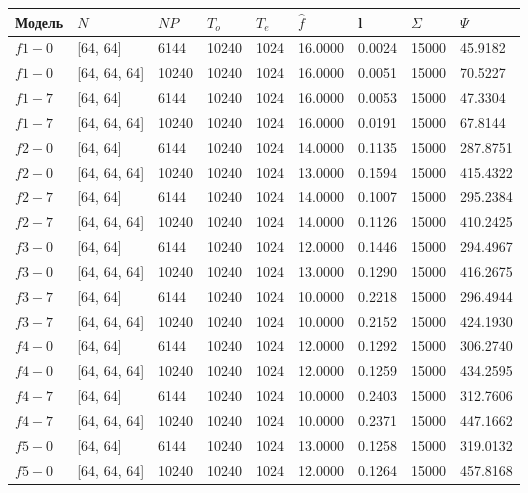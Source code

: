 \begin{table}[H]
	\begin{tabular}{|l|l|l|l|l|l|l|l|l|}
		\hline
Модель   & $N$&$NP$& $T_o$       & $T_e$  & $\hat{f}$ & l   & $\Sigma$ & $\Psi$ \\ \hline
$ f1-0 $  & [64, 64] & 6144 & 10240 & 1024 & 16.0000 & 0.0024 & 15000 & 45.9182 \\ \hline
$ f1-0 $  & [64, 64, 64] & 10240 & 10240 & 1024 & 16.0000 & 0.0051 & 15000 & 70.5227 \\ \hline
$ f1-7 $  & [64, 64] & 6144 & 10240 & 1024 & 16.0000 & 0.0053 & 15000 & 47.3304 \\ \hline
$ f1-7 $  & [64, 64, 64] & 10240 & 10240 & 1024 & 16.0000 & 0.0191 & 15000 & 67.8144 \\ \hline
$ f2-0 $  & [64, 64] & 6144 & 10240 & 1024 & 14.0000 & 0.1135 & 15000 & 287.8751 \\ \hline
$ f2-0 $  & [64, 64, 64] & 10240 & 10240 & 1024 & 13.0000 & 0.1594 & 15000 & 415.4322 \\ \hline
$ f2-7 $  & [64, 64] & 6144 & 10240 & 1024 & 14.0000 & 0.1007 & 15000 & 295.2384 \\ \hline
$ f2-7 $  & [64, 64, 64] & 10240 &10240 & 1024 & 14.0000 & 0.1126 & 15000 & 410.2425 \\ \hline
$ f3-0 $  & [64, 64] & 6144 & 10240 & 1024 & 12.0000 & 0.1446 & 15000 & 294.4967 \\ \hline
$ f3-0 $  & [64, 64, 64] & 10240 & 10240 & 1024 & 13.0000 & 0.1290 & 15000 & 416.2675 \\ \hline
$ f3-7 $  & [64, 64] & 6144 &10240 & 1024 & 10.0000 & 0.2218 & 15000 & 296.4944 \\ \hline
$ f3-7 $  & [64, 64, 64] & 10240 &10240 & 1024 & 10.0000 & 0.2152 & 15000 & 424.1930 \\ \hline
$ f4-0 $  & [64, 64] & 6144 & 10240& 1024 & 12.0000 & 0.1292 & 15000 & 306.2740 \\ \hline
$ f4-0 $  & [64, 64, 64] & 10240 & 10240 & 1024 & 12.0000 & 0.1259 & 15000 & 434.2595 \\ \hline
$ f4-7 $  & [64, 64] & 6144 & 10240 & 1024 & 10.0000 & 0.2403 & 15000 & 312.7606 \\ \hline
$ f4-7 $  & [64, 64, 64] & 10240 & 10240 & 1024 & 10.0000 & 0.2371 & 15000 & 447.1662 \\ \hline
$ f5-0 $  & [64, 64] & 6144 & 10240 & 1024 & 13.0000 & 0.1258 & 15000 & 319.0132 \\ \hline
$ f5-0 $  & [64, 64, 64] & 10240 & 10240 & 1024 & 12.0000 & 0.1264 & 15000 & 457.8168 \\ \hline

\end{tabular}
\end{table}
